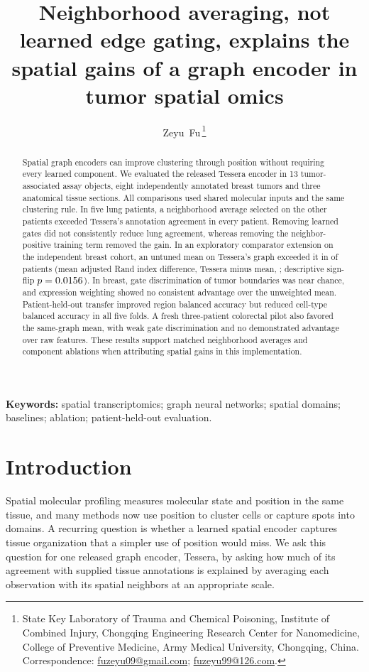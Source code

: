 \documentclass[11pt]{article}
\title{Neighborhood averaging, not learned edge gating, explains the spatial gains of a graph encoder in tumor spatial omics}
\author{Zeyu~Fu\,\orcidlink{0009-0001-8329-0108}\thanks{State Key Laboratory of Trauma and Chemical Poisoning, Institute of Combined Injury, Chongqing Engineering Research Center for Nanomedicine, College of Preventive Medicine, Army Medical University, Chongqing, China. Correspondence: \href{mailto:fuzeyu09@gmail.com}{fuzeyu09@gmail.com}; \href{mailto:fuzeyu99@126.com}{fuzeyu99@126.com}.}}
\date{}
\begin{document}
\raggedbottom\maketitle
\begin{abstract}
Spatial graph encoders can improve clustering through position without requiring every learned component. We evaluated the released Tessera encoder in 13 tumor-associated assay objects, eight independently annotated breast tumors and three anatomical tissue sections. All comparisons used shared molecular inputs and the same clustering rule. In five lung patients, a neighborhood average selected on the other patients exceeded Tessera's annotation agreement in every patient. Removing learned gates did not consistently reduce lung agreement, whereas removing the neighbor-positive training term removed the gain. In an exploratory comparator extension on the independent breast cohort, an untuned mean on Tessera's graph exceeded it in \HerAllTessUSixNeg{} of \HerPatients{} patients (mean adjusted Rand index difference, Tessera minus mean, \HerAllTessUSixMean{}; descriptive sign-flip \(p=0.0156{}\)). In breast, gate discrimination of tumor boundaries was near chance, and expression weighting showed no consistent advantage over the unweighted mean. Patient-held-out transfer improved region balanced accuracy but reduced cell-type balanced accuracy in all five folds. A fresh three-patient colorectal pilot also favored the same-graph mean, with weak gate discrimination and no demonstrated advantage over raw features. These results support matched neighborhood averages and component ablations when attributing spatial gains in this implementation.
\end{abstract}
\noindent\textbf{Keywords:} spatial transcriptomics; graph neural networks; spatial domains; baselines; ablation; patient-held-out evaluation.

\section{Introduction}
Spatial molecular profiling measures molecular state and position in the same tissue, and many methods now use position to cluster cells or capture spots into domains. A recurring question is whether a learned spatial encoder captures tissue organization that a simpler use of position would miss. We ask this question for one released graph encoder, Tessera, by asking how much of its agreement with supplied tissue annotations is explained by averaging each observation with its spatial neighbors at an appropriate scale.
\end{document}
